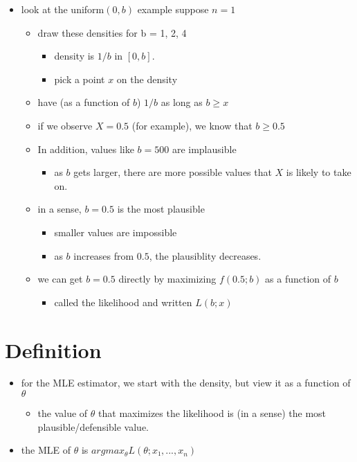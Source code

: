 \begin{itemize}
\item look at the uniform$(0,b)$ example suppose $n = 1$
\begin{itemize}
\item draw these densities for b = 1, 2, 4
\begin{itemize}
\item density is $1/b$ in $[0,b]$.
\item pick a point $x$ on the density
\end{itemize}
\item have (as a function of $b$) $1/b$ as long as $b ≥ x$
\item if we observe $X = 0.5$ (for example), we know that $b ≥ 0.5$
\item In addition, values like $b = 500$ are implausible
\begin{itemize}
\item as $b$ gets larger, there are more possible values that $X$ is
         likely to take on.
\end{itemize}
\item in a sense, $b = 0.5$ is the most plausible
\begin{itemize}
\item smaller values are impossible
\item as $b$ increases from $0.5$, the plausiblity decreases.
\end{itemize}
\item we can get $b = 0.5$ directly by maximizing $f(0.5; b)$ as a
       function of $b$
\begin{itemize}
\item called the likelihood and written $L(b; x)$
\end{itemize}
\end{itemize}
\end{itemize}

\section{Definition}

\begin{itemize}
\item for the MLE estimator, we start with the density, but view it as a
     function of $θ$
\begin{itemize}
\item the value of $θ$ that maximizes the likelihood is (in a sense) the most plausible/defensible value.
\end{itemize}
\item the MLE of $θ$ is $argmax_θ L(θ; x₁,...,x_n)$
\end{itemize}

